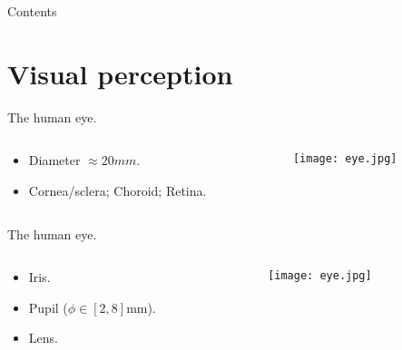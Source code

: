 




\begin{frame}
\titlepage %
\end{frame}


\begin{frame}{Contents}
\setcounter{tocdepth}{1}
\tableofcontents
\end{frame}




\section{Visual perception}


\begin{frame}
The human eye.
\begin{columns}
\begin{column}{.3\textwidth}
\begin{itemize}
\item Diameter $\approx 20mm$.
\item Cornea/sclera; Choroid; Retina.
\end{itemize}
\end{column}
\begin{column}{.7\textwidth}
\begin{figure}
\texttt{[image: eye.jpg]}
\end{figure}
\end{column}
\end{columns}
\end{frame}


\begin{frame}
The human eye.
\begin{columns}
\begin{column}{.3\textwidth}
\begin{itemize}
\item Iris.
\item Pupil ($\phi\in [2,8] \text{mm}$).
\item Lens.
\end{itemize}
\end{column}
\begin{column}{.7\textwidth}
\begin{figure}
\texttt{[image: eye.jpg]}
\end{figure}
\end{column}
\end{columns}
\end{frame}


